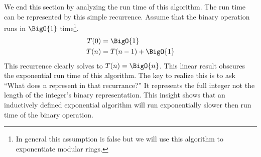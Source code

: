 \documentclass[./Thesis.tex]{subfiles}
\begin{document}
We end this section by analyzing the run time of this algorithm. The run time
can be represented by this simple recurrence. Assume that the binary operation
runs in $\BigO{1}$ time\footnote
{In general this assumption is false but we
  will use this algorithm to exponentiate modular rings.
}.
\begin{align}
  \label{eqn:slow-recurrence}
  \begin{split}
    T(0) &= \BigO{1} \\
    T(n) &= T(n - 1) + \BigO{1}
  \end{split}
\end{align}
This recurrence clearly solves to $T(n) = \BigO{n}$. This linear result obscures
the exponential run time of this algorithm. The key to realize this is to ask
``What does n represent in that recurrance?'' It represents the full integer not
the length of the integer's binary representation. This insight shows that an inductively
defined exponential algorithm will run exponentially slower then run time of the
binary operation.
\end{document}
